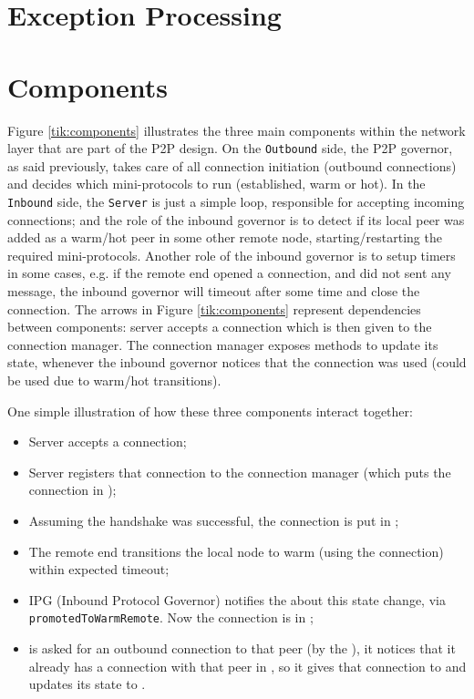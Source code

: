 \section{Exception Processing}
\label{sec:exceptions}

\section{Components}

Figure \ref{tik:components} illustrates the three main components within the network
layer that are part of the P2P design. On the \texttt{Outbound} side, the
P2P governor, as said previously, takes care of all connection initiation (outbound
connections) and decides which mini-protocols to run (established, warm or hot).
In the \texttt{Inbound} side, the \texttt{Server} is just a simple loop, responsible for accepting incoming
connections; and the role of the inbound governor is to detect if its local peer was
added as a warm/hot peer in some other remote node, starting/restarting the required
mini-protocols. Another role of the inbound governor is to setup timers in
some cases, e.g. if the remote end opened a connection, and did not sent any message, the
inbound governor will timeout after some time and close the connection.
The arrows in Figure \ref{tik:components} represent dependencies between components:
server accepts a connection which is then given to the connection manager. The connection manager exposes methods to update its state,
whenever the inbound governor notices that the connection was used
(could be used due to warm/hot transitions).


One simple illustration of how these three components interact together:

\begin{itemize}
    \item Server accepts a connection;
    \item Server registers that connection to the connection manager (which puts the
      connection in \UnnegotiatedStateIn{});
    \item Assuming the handshake was successful, the connection is put in
      \InboundIdleStateDup{};
    \item The remote end transitions the local node to warm (using the connection) within expected timeout;
    \item IPG (Inbound Protocol Governor) notifies the \Connmngr{} about this state
      change, via \texttt{promotedToWarmRemote}. Now the connection is
      in \InboundStateDup{};
    \item \Connmngr{} is asked for an outbound connection to that peer (by the \ptopgov{}), it notices
      that it already has a connection with that peer in \InboundStateDup{}, so it gives
      that connection to \ptopgov{} and updates its state to \DuplexState{}.
\end{itemize}

